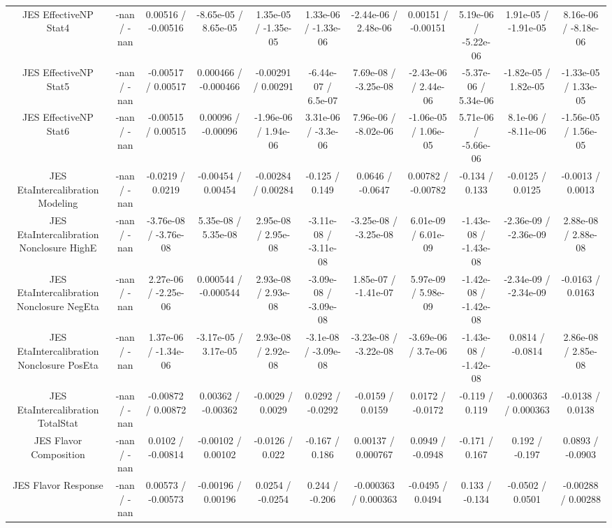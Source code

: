 \begin{table}[htbp]
\begin{center}
\begin{tabular}{|c|c|c|c|c|c|c|c|c|c|c|}
  JES EffectiveNP Stat4 & -nan / -nan & 0.00516 / -0.00516 & -8.65e-05 / 8.65e-05 & 1.35e-05 / -1.35e-05 & 1.33e-06 / -1.33e-06 & -2.44e-06 / 2.48e-06 & 0.00151 / -0.00151 & 5.19e-06 / -5.22e-06 & 1.91e-05 / -1.91e-05 & 8.16e-06 / -8.18e-06 \\ 
  JES EffectiveNP Stat5 & -nan / -nan & -0.00517 / 0.00517 & 0.000466 / -0.000466 & -0.00291 / 0.00291 & -6.44e-07 / 6.5e-07 & 7.69e-08 / -3.25e-08 & -2.43e-06 / 2.44e-06 & -5.37e-06 / 5.34e-06 & -1.82e-05 / 1.82e-05 & -1.33e-05 / 1.33e-05 \\ 
  JES EffectiveNP Stat6 & -nan / -nan & -0.00515 / 0.00515 & 0.00096 / -0.00096 & -1.96e-06 / 1.94e-06 & 3.31e-06 / -3.3e-06 & 7.96e-06 / -8.02e-06 & -1.06e-05 / 1.06e-05 & 5.71e-06 / -5.66e-06 & 8.1e-06 / -8.11e-06 & -1.56e-05 / 1.56e-05 \\ 
  JES EtaIntercalibration Modeling & -nan / -nan & -0.0219 / 0.0219 & -0.00454 / 0.00454 & -0.00284 / 0.00284 & -0.125 / 0.149 & 0.0646 / -0.0647 & 0.00782 / -0.00782 & -0.134 / 0.133 & -0.0125 / 0.0125 & -0.0013 / 0.0013 \\ 
  JES EtaIntercalibration Nonclosure HighE & -nan / -nan & -3.76e-08 / -3.76e-08 & 5.35e-08 / 5.35e-08 & 2.95e-08 / 2.95e-08 & -3.11e-08 / -3.11e-08 & -3.25e-08 / -3.25e-08 & 6.01e-09 / 6.01e-09 & -1.43e-08 / -1.43e-08 & -2.36e-09 / -2.36e-09 & 2.88e-08 / 2.88e-08 \\ 
  JES EtaIntercalibration Nonclosure NegEta & -nan / -nan & 2.27e-06 / -2.25e-06 & 0.000544 / -0.000544 & 2.93e-08 / 2.93e-08 & -3.09e-08 / -3.09e-08 & 1.85e-07 / -1.41e-07 & 5.97e-09 / 5.98e-09 & -1.42e-08 / -1.42e-08 & -2.34e-09 / -2.34e-09 & -0.0163 / 0.0163 \\ 
  JES EtaIntercalibration Nonclosure PosEta & -nan / -nan & 1.37e-06 / -1.34e-06 & -3.17e-05 / 3.17e-05 & 2.93e-08 / 2.92e-08 & -3.1e-08 / -3.09e-08 & -3.23e-08 / -3.22e-08 & -3.69e-06 / 3.7e-06 & -1.43e-08 / -1.42e-08 & 0.0814 / -0.0814 & 2.86e-08 / 2.85e-08 \\ 
  JES EtaIntercalibration TotalStat & -nan / -nan & -0.00872 / 0.00872 & 0.00362 / -0.00362 & -0.0029 / 0.0029 & 0.0292 / -0.0292 & -0.0159 / 0.0159 & 0.0172 / -0.0172 & -0.119 / 0.119 & -0.000363 / 0.000363 & -0.0138 / 0.0138 \\ 
  JES Flavor Composition & -nan / -nan & 0.0102 / -0.00814 & -0.00102 / 0.00102 & -0.0126 / 0.022 & -0.167 / 0.186 & 0.00137 / 0.000767 & 0.0949 / -0.0948 & -0.171 / 0.167 & 0.192 / -0.197 & 0.0893 / -0.0903 \\ 
  JES Flavor Response & -nan / -nan & 0.00573 / -0.00573 & -0.00196 / 0.00196 & 0.0254 / -0.0254 & 0.244 / -0.206 & -0.000363 / 0.000363 & -0.0495 / 0.0494 & 0.133 / -0.134 & -0.0502 / 0.0501 & -0.00288 / 0.00288 \\ 

\end{tabular}
\end{center}
\end{table}
